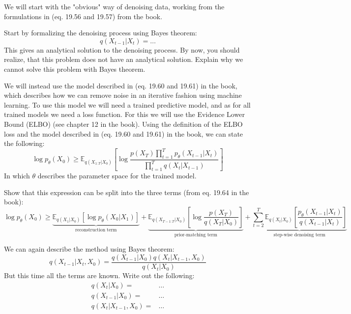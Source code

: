\documentclass[12pt]{article}    %
\begin{document}

\exminor
We will start with the "obvious" way of denoising data, working from the formulations in (eq. 19.56 and 19.57) from the book.

Start by formalizing the denoising process using Bayes theorem:
\begin{equation}
  q(X_{t-1}|X_t) = \dots
\end{equation}
This gives an analytical solution to the denoising process. 
By now, you should realize, that this problem does not have an analytical solution.
Explain why we cannot solve this problem with Bayes theorem.

\exminor
We will instead use the model described in (eq. 19.60 and 19.61) in the book, 
which describes how we can remove noise in an iterative fashion using machine learning.
To use this model we will need a trained predictive model, and as for all trained models we need a loss function. 
For this we will use the Evidence Lower Bound (ELBO) (see chapter 12 in the book).
Using the definition of the ELBO loss and the model described in (eq. 19.60 and 19.61) in the book, we can state the following:
\begin{equation}
    \log p_{\theta}(X_0) \geq \mathbb{E}_{q(X_{1:T}|X_0)}\left[ \log \frac{p(X_T) \prod_{t=1}^{T} p_{\theta}(X_{t-1}|X_t)}{\prod_{t=1}^{T} q(X_t|X_{t-1})} \right]
\end{equation}
In which $\theta$ describes the parameter space for the trained model.

Show that this expression can be split into the three terms (from eq. 19.64 in the book):
\begin{equation}
    \log p_{\theta}(X_0) \geq \underbrace{\mathbb{E}_{q(X_{1}|X_0)} [\log p_{\theta}(X_0|X_1)]}_{\text{reconstruction term}} +\underbrace{\mathbb{E}_{q(X_{T-1:T}|X_0)} \left[ \log \frac{p(X_T)}{q(X_T|X_{0})} \right]}_{\text{prior-matching term}} + \underbrace{\sum_{t=2}^{T}\mathbb{E}_{q(X_{t}|X_0)}\left[\frac{p_{\theta}(X_{t-1}|X_{t})}{q(X_{t-1}|X_{t})} \right]}_{\text{step-wise denoising term}}
\end{equation}

\exminor
We can again describe the method using Bayes theorem:
\begin{equation} \label{eq:bayes-diffusion-denoising}
    q(X_{t-1}|X_{t}, X_0) = \frac{q(X_{t-1}|X_0)q(X_t|X_{t-1},X_0)}{q(X_t|X_0)}
\end{equation} 
But this time all the terms are known. Write out the following:
\begin{align}
    q(X_t|X_0) =& \dots \\
    q(X_{t-1}|X_0) =& \dots \\
    q(X_t|X_{t-1},X_0) =& \dots
\end{align}
\end{document}
